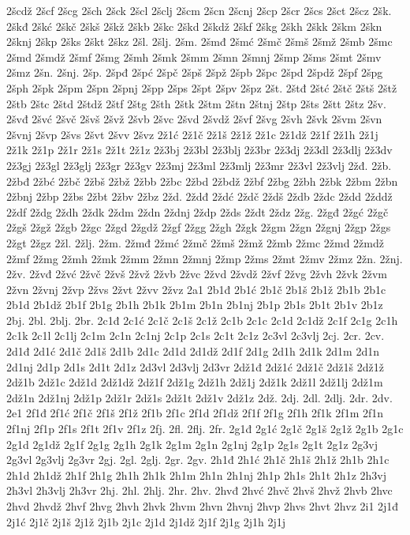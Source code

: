 {2šcdž
2šcf
2šcg
2šch
2šck
2šcl
2šclj
2šcm
2šcn
2šcnj
2šcp
2šcr
2šcs
2šct
2šcz
2šk.
2škđ
2škć
2škč
2škš
2škž
2škb
2škc
2škd
2škdž
2škf
2škg
2škh
2škk
2škm
2škn
2šknj
2škp
2šks
2škt
2škz
2šl.
2šlj.
2šm.
2šmđ
2šmć
2šmč
2šmš
2šmž
2šmb
2šmc
2šmd
2šmdž
2šmf
2šmg
2šmh
2šmk
2šmm
2šmn
2šmnj
2šmp
2šms
2šmt
2šmv
2šmz
2šn.
2šnj.
2šp.
2špđ
2špć
2špč
2špš
2špž
2špb
2špc
2špd
2špdž
2špf
2špg
2šph
2špk
2špm
2špn
2špnj
2špp
2šps
2špt
2špv
2špz
2št.
2štđ
2štć
2štč
2štš
2štž
2štb
2štc
2štd
2štdž
2štf
2štg
2šth
2štk
2štm
2štn
2štnj
2štp
2šts
2štt
2štz
2šv.
2švđ
2švć
2švč
2švš
2švž
2švb
2švc
2švd
2švdž
2švf
2švg
2švh
2švk
2švm
2švn
2švnj
2švp
2švs
2švt
2švv
2švz
2ž1ć
2ž1č
2ž1š
2ž1ž
2ž1c
2ž1dž
2ž1f
2ž1h
2ž1j
2ž1k
2ž1p
2ž1r
2ž1s
2ž1t
2ž1z
2ž3bj
2ž3bl
2ž3blj
2ž3br
2ž3dj
2ž3dl
2ž3dlj
2ž3dv
2ž3gj
2ž3gl
2ž3glj
2ž3gr
2ž3gv
2ž3mj
2ž3ml
2ž3mlj
2ž3mr
2ž3vl
2ž3vlj
2žđ.
2žb.
2žbđ
2žbć
2žbč
2žbš
2žbž
2žbb
2žbc
2žbd
2žbdž
2žbf
2žbg
2žbh
2žbk
2žbm
2žbn
2žbnj
2žbp
2žbs
2žbt
2žbv
2žbz
2žd.
2ždđ
2ždć
2ždč
2ždš
2ždb
2ždc
2ždd
2žddž
2ždf
2ždg
2ždh
2ždk
2ždm
2ždn
2ždnj
2ždp
2žds
2ždt
2ždz
2žg.
2žgđ
2žgć
2žgč
2žgš
2žgž
2žgb
2žgc
2žgd
2žgdž
2žgf
2žgg
2žgh
2žgk
2žgm
2žgn
2žgnj
2žgp
2žgs
2žgt
2žgz
2žl.
2žlj.
2žm.
2žmđ
2žmć
2žmč
2žmš
2žmž
2žmb
2žmc
2žmd
2žmdž
2žmf
2žmg
2žmh
2žmk
2žmm
2žmn
2žmnj
2žmp
2žms
2žmt
2žmv
2žmz
2žn.
2žnj.
2žv.
2žvđ
2žvć
2žvč
2žvš
2žvž
2žvb
2žvc
2žvd
2žvdž
2žvf
2žvg
2žvh
2žvk
2žvm
2žvn
2žvnj
2žvp
2žvs
2žvt
2žvv
2žvz
2a1
2b1đ
2b1ć
2b1č
2b1š
2b1ž
2b1b
2b1c
2b1d
2b1dž
2b1f
2b1g
2b1h
2b1k
2b1m
2b1n
2b1nj
2b1p
2b1s
2b1t
2b1v
2b1z
2bj.
2bl.
2blj.
2br.
2c1đ
2c1ć
2c1č
2c1š
2c1ž
2c1b
2c1c
2c1d
2c1dž
2c1f
2c1g
2c1h
2c1k
2c1l
2c1lj
2c1m
2c1n
2c1nj
2c1p
2c1s
2c1t
2c1z
2c3vl
2c3vlj
2cj.
2cr.
2cv.
2d1đ
2d1ć
2d1č
2d1š
2d1b
2d1c
2d1d
2d1dž
2d1f
2d1g
2d1h
2d1k
2d1m
2d1n
2d1nj
2d1p
2d1s
2d1t
2d1z
2d3vl
2d3vlj
2d3vr
2dž1đ
2dž1ć
2dž1č
2dž1š
2dž1ž
2dž1b
2dž1c
2dž1d
2dž1dž
2dž1f
2dž1g
2dž1h
2dž1j
2dž1k
2dž1l
2dž1lj
2dž1m
2dž1n
2dž1nj
2dž1p
2dž1r
2dž1s
2dž1t
2dž1v
2dž1z
2dž.
2dj.
2dl.
2dlj.
2dr.
2dv.
2e1
2f1đ
2f1ć
2f1č
2f1š
2f1ž
2f1b
2f1c
2f1d
2f1dž
2f1f
2f1g
2f1h
2f1k
2f1m
2f1n
2f1nj
2f1p
2f1s
2f1t
2f1v
2f1z
2fj.
2fl.
2flj.
2fr.
2g1đ
2g1ć
2g1č
2g1š
2g1ž
2g1b
2g1c
2g1d
2g1dž
2g1f
2g1g
2g1h
2g1k
2g1m
2g1n
2g1nj
2g1p
2g1s
2g1t
2g1z
2g3vj
2g3vl
2g3vlj
2g3vr
2gj.
2gl.
2glj.
2gr.
2gv.
2h1đ
2h1ć
2h1č
2h1š
2h1ž
2h1b
2h1c
2h1d
2h1dž
2h1f
2h1g
2h1h
2h1k
2h1m
2h1n
2h1nj
2h1p
2h1s
2h1t
2h1z
2h3vj
2h3vl
2h3vlj
2h3vr
2hj.
2hl.
2hlj.
2hr.
2hv.
2hvđ
2hvć
2hvč
2hvš
2hvž
2hvb
2hvc
2hvd
2hvdž
2hvf
2hvg
2hvh
2hvk
2hvm
2hvn
2hvnj
2hvp
2hvs
2hvt
2hvz
2i1
2j1đ
2j1ć
2j1č
2j1š
2j1ž
2j1b
2j1c
2j1d
2j1dž
2j1f
2j1g
2j1h
2j1j
}
